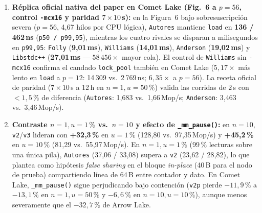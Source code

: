 \documentclass[11pt,a4paper]{article}
\begin{document}
\begin{enumerate}
  \item \textbf{Réplica oficial nativa del paper en Comet Lake (Fig.~6 a $p=56$, control \texttt{-mcx16} y paridad $7\times 10$\,s):} en la Figura~6 bajo sobresuscripción severa (\textbf{$p=56$}, 4{,}67 hilos por CPU lógica), \texttt{Autores} mantiene \texttt{load} en \textbf{136 / 462\,ns} (\texttt{p50 / p99,95}), mientras los cuatro rivales se disparan a milisegundos en \texttt{p99,95}: \texttt{Folly} (\textbf{9{,}01\,ms}), \texttt{Williams} (\textbf{14{,}01\,ms}), \texttt{Anderson} (\textbf{19{,}02\,ms}) y \texttt{Libstdc++} (\textbf{27{,}01\,ms} --- $58\,456\times$ mayor cola). El control de \texttt{Williams} sin \texttt{-mcx16} confirma el candado \texttt{lock\_pool} también en Comet Lake ($5{,}17\times$ más lento en \texttt{load} a $p=12$: 14\,309 vs.\ 2\,769\,ns; $6{,}35\times$ a $p=56$). La receta oficial de paridad ($7\times 10$\,s a 12\,h en $n=1, u=50\,\%$) valida las corridas de $2$\,s con $<1{,}5\,\%$ de diferencia (\texttt{Autores}: 1{,}683 vs.\ 1{,}66\,Mop/s; \texttt{Anderson}: 3{,}463 vs.\ 3{,}46\,Mop/s).

  \item \textbf{Contraste $n=1, u=1\,\%$ vs.\ $n=10$ y efecto de \texttt{\_mm\_pause()}:} en $n=10$, \texttt{v2}/\texttt{v3} lideran con \textbf{+32{,}3\,\%} en $u=1\,\%$ (128{,}80 vs.\ 97{,}35\,Mop/s) y \textbf{+45{,}2\,\%} en $u=10\,\%$ (81{,}29 vs.\ 55{,}97\,Mop/s). En $n=1, u=1\,\%$ (99\,\% lecturas sobre una única pila), \texttt{Autores} (37{,}06 / 33{,}08) supera a \texttt{v2} (23{,}62 / 28{,}82), lo que plantea como hipótesis \emph{false sharing} en el bloque \emph{in-place} (40\,B para el nodo de prueba) compartiendo línea de 64\,B entre contador y dato. En Comet Lake, \texttt{\_mm\_pause()} sigue perjudicando bajo contención (\texttt{v2p} pierde $-11{,}9\,\%$ a $-13{,}1\,\%$ en $n=1, u=50\,\%$ y $-6{,}6\,\%$ en $n=10, u=10\,\%$), aunque menos severamente que el $-32{,}7\,\%$ de Arrow Lake.


\end{enumerate}
\end{document}
